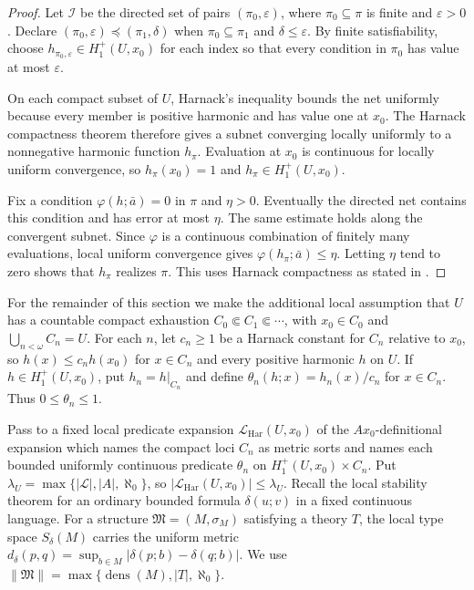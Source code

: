 \documentclass{amsart}
\theoremstyle{definition}
\theoremstyle{remark}
\numberwithin{equation}{section}
\begin{document}
\begin{proof}
Let $\mathcal I$ be the directed set of pairs
$(\pi_0,\varepsilon)$, where $\pi_0\subseteq\pi$ is finite and
$\varepsilon>0$. Declare
$(\pi_0,\varepsilon)\preceq(\pi_1,\delta)$ when
$\pi_0\subseteq\pi_1$ and $\delta\le\varepsilon$. By finite
satisfiability, choose $h_{\pi_0,\varepsilon}\in
H_1^+(U,x_0)$ for each index so that every condition in $\pi_0$ has
value at most $\varepsilon$.

On each compact subset of $U$, Harnack's inequality
bounds the net uniformly because every member is positive harmonic
and has value one at $x_0$. The Harnack compactness theorem therefore
gives a subnet converging locally uniformly to a nonnegative harmonic
function $h_\pi$. Evaluation at $x_0$ is continuous for locally
uniform convergence, so $h_\pi(x_0)=1$ and
$h_\pi\in H_1^+(U,x_0)$.

Fix a condition $\varphi(h;\bar a)=0$ in $\pi$ and $\eta>0$.
Eventually the directed net contains this condition and has error at
most $\eta$. The same estimate holds along the convergent subnet.
Since $\varphi$ is a continuous combination of finitely many
evaluations, local uniform convergence gives
$\varphi(h_\pi;\bar a)\le\eta$. Letting $\eta$ tend to zero shows
that $h_\pi$ realizes $\pi$. This uses Harnack compactness as stated in \cite[Theorem~1]{LW1965axiomatic}.
\end{proof}

For the remainder of this section we make the additional local
assumption that $U$ has a countable compact exhaustion
$C_0\Subset C_1\Subset\cdots$, with $x_0\in C_0$ and
$\bigcup_{n<\omega}C_n=U$. For each $n$, let $c_n\ge1$ be a Harnack
constant for $C_n$ relative to $x_0$, so $h(x)\le c_nh(x_0)$ for
$x\in C_n$ and every positive harmonic $h$ on $U$. If
$h\in H_1^+(U,x_0)$, put $h_n=h|_{C_n}$ and define
$\theta_n(h;x)=h_n(x)/c_n$ for $x\in C_n$. Thus
$0\le\theta_n\le1$.

Pass to a fixed local predicate expansion $\mathcal L_{\mathrm{Har}}(U,x_0)$
of the $Ax_0$-definitional expansion which names the compact loci $C_n$
as metric sorts and names each bounded uniformly continuous predicate
$\theta_n$ on $H_1^+(U,x_0)\times C_n$. %
Put
$\lambda_U=\max\{|\mathcal L|,|A|,\aleph_0\}$, so
$|\mathcal L_{\mathrm{Har}}(U,x_0)|\le\lambda_U$.
Recall the local stability theorem for an ordinary bounded
formula $\delta(u;v)$ in a fixed continuous language. For a structure $\mathfrak M=(M,\sigma_M)$ satisfying a theory $T$,
the local type space $S_\delta(M)$ carries the uniform metric
$d_\delta(p,q)=\sup_{b\in M}|\delta(p;b)-\delta(q;b)|$. We use
$\|\mathfrak M\|=\max\{\operatorname{dens}(M),|T|,\aleph_0\}$.
\end{document}
